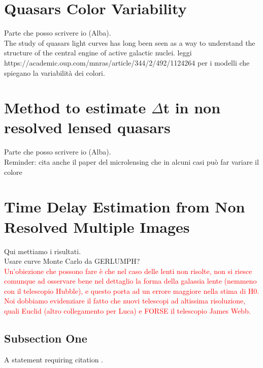 \documentclass[twoside,twocolumn]{article}
\begin{document}
\section{Quasars Color Variability}
Parte che posso scrivere io (Alba).
\\
The study of quasars light curves has long been seen as a way to understand the structure of the central engine of active galactic nuclei.
leggi https://academic.oup.com/mnras/article/344/2/492/1124264 per i modelli che spiegano la variabilità dei colori.


\section{Method to estimate $\Delta$t in non resolved lensed quasars}
Parte che posso scrivere io (Alba).
\\
Reminder: cita anche il paper del microlensing che in alcuni casi può far variare il colore

\section{Time Delay Estimation from Non Resolved Multiple Images}

Qui mettiamo i risultati.
\\
Usare curve Monte Carlo da GERLUMPH?
\\
\textcolor{red}{Un'obiezione che possono fare è che nel caso delle lenti non risolte, non si riesce comunque ad osservare bene nel dettaglio la forma della galassia lente (nemmeno con il telescopio Hubble), e questo porta ad un errore maggiore nella stima di H0. Noi dobbiamo evidenziare il fatto che nuovi telescopi ad altissima risoluzione, quali Euclid (altro collegamento per Luca) e FORSE il telescopio James Webb.}


\subsection{Subsection One}

A statement requiring citation \cite{Figueredo:2009dg}.



\nocite{*}
\onecolumn{\printbibliography}
\end{document}
